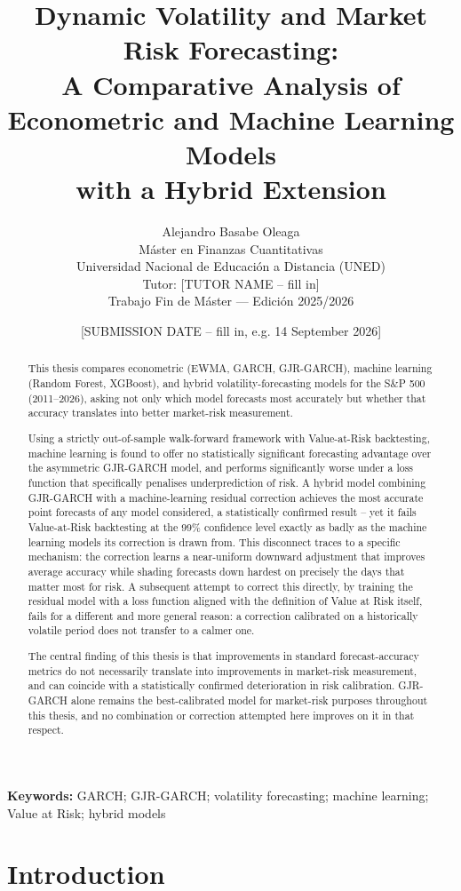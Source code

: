 \documentclass[12pt,a4paper]{article}
\title{
Dynamic Volatility and Market Risk Forecasting:\\
A Comparative Analysis of Econometric and Machine Learning Models\\
with a Hybrid Extension
}
\author{
Alejandro Basabe Oleaga \\[6pt]
M\'aster en Finanzas Cuantitativas \\
Universidad Nacional de Educaci\'on a Distancia (UNED) \\
Tutor: [TUTOR NAME -- fill in] \\[6pt]
Trabajo Fin de M\'aster --- Edici\'on 2025/2026
}
\date{[SUBMISSION DATE -- fill in, e.g. 14 September 2026]}
\begin{document}
\maketitle

\begin{abstract}
This thesis compares econometric (EWMA, GARCH, GJR-GARCH), machine learning (Random Forest,
XGBoost), and hybrid volatility-forecasting models for the S\&P 500 (2011--2026), asking not only
which model forecasts most accurately but whether that accuracy translates into better
market-risk measurement.

Using a strictly out-of-sample walk-forward framework with Value-at-Risk backtesting, machine
learning is found to offer no statistically significant forecasting advantage over the
asymmetric GJR-GARCH model, and performs significantly worse under a loss function that
specifically penalises underprediction of risk. A hybrid model combining GJR-GARCH with a
machine-learning residual correction achieves the most accurate point forecasts of any model
considered, a statistically confirmed result -- yet it fails Value-at-Risk backtesting at the
99\% confidence level exactly as badly as the machine learning models its correction is drawn
from. This disconnect traces to a specific mechanism: the correction learns a near-uniform
downward adjustment that improves average accuracy while shading forecasts down hardest on
precisely the days that matter most for risk. A subsequent attempt to correct this directly, by
training the residual model with a loss function aligned with the definition of Value at Risk
itself, fails for a different and more general reason: a correction calibrated on a historically
volatile period does not transfer to a calmer one.

The central finding of this thesis is that improvements in standard forecast-accuracy metrics do
not necessarily translate into improvements in market-risk measurement, and can coincide with a
statistically confirmed deterioration in risk calibration. GJR-GARCH alone remains the
best-calibrated model for market-risk purposes throughout this thesis, and no combination or
correction attempted here improves on it in that respect.
\end{abstract}

\noindent\textbf{Keywords:} GARCH; GJR-GARCH; volatility forecasting; machine learning;
Value at Risk; hybrid models

\tableofcontents
\listoftables
\listoffigures
\newpage

\section{Introduction}
\end{document}
